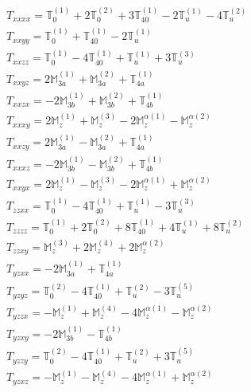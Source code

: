 \documentclass[fleqn,8pt,landscape]{jsarticle}
\begin{document}
\begin{align*}
& T_{xxxx} = \mathbb{T}_{0}^{(1)} + 2 \mathbb{T}_{0}^{(2)} + 3 \mathbb{T}_{40}^{(1)} - 2 \mathbb{T}_{u}^{(1)} - 4 \mathbb{T}_{u}^{(2)} \\
& T_{xxyy} = \mathbb{T}_{0}^{(1)} + \mathbb{T}_{40}^{(1)} - 2 \mathbb{T}_{u}^{(1)} \\
& T_{xxzz} = \mathbb{T}_{0}^{(1)} - 4 \mathbb{T}_{40}^{(1)} + \mathbb{T}_{u}^{(1)} + 3 \mathbb{T}_{u}^{(3)} \\
& T_{xxyz} = 2 \mathbb{M}_{3a}^{(1)} + \mathbb{M}_{3a}^{(2)} + \mathbb{T}_{4a}^{(1)} \\
& T_{xxzx} = - 2 \mathbb{M}_{3b}^{(1)} + \mathbb{M}_{3b}^{(2)} + \mathbb{T}_{4b}^{(1)} \\
& T_{xxxy} = 2 \mathbb{M}_{z}^{(1)} + \mathbb{M}_{z}^{(3)} - 2 \mathbb{M}_{z}^{\alpha(1)} - \mathbb{M}_{z}^{\alpha(2)} \\
& T_{xxzy} = 2 \mathbb{M}_{3a}^{(1)} - \mathbb{M}_{3a}^{(2)} + \mathbb{T}_{4a}^{(1)} \\
& T_{xxxz} = - 2 \mathbb{M}_{3b}^{(1)} - \mathbb{M}_{3b}^{(2)} + \mathbb{T}_{4b}^{(1)} \\
& T_{xxyx} = 2 \mathbb{M}_{z}^{(1)} - \mathbb{M}_{z}^{(3)} - 2 \mathbb{M}_{z}^{\alpha(1)} + \mathbb{M}_{z}^{\alpha(2)} \\
& T_{zzxx} = \mathbb{T}_{0}^{(1)} - 4 \mathbb{T}_{40}^{(1)} + \mathbb{T}_{u}^{(1)} - 3 \mathbb{T}_{u}^{(3)} \\
& T_{zzzz} = \mathbb{T}_{0}^{(1)} + 2 \mathbb{T}_{0}^{(2)} + 8 \mathbb{T}_{40}^{(1)} + 4 \mathbb{T}_{u}^{(1)} + 8 \mathbb{T}_{u}^{(2)} \\
& T_{zzxy} = \mathbb{M}_{z}^{(3)} + 2 \mathbb{M}_{z}^{(4)} + 2 \mathbb{M}_{z}^{\alpha(2)} \\
& T_{yzxx} = - 2 \mathbb{M}_{3a}^{(1)} + \mathbb{T}_{4a}^{(1)} \\
& T_{yzyz} = \mathbb{T}_{0}^{(2)} - 4 \mathbb{T}_{40}^{(1)} + \mathbb{T}_{u}^{(2)} - 3 \mathbb{T}_{u}^{(5)} \\
& T_{yzzx} = - \mathbb{M}_{z}^{(1)} + \mathbb{M}_{z}^{(4)} - 4 \mathbb{M}_{z}^{\alpha(1)} - \mathbb{M}_{z}^{\alpha(2)} \\
& T_{yzxy} = - 2 \mathbb{M}_{3b}^{(1)} - \mathbb{T}_{4b}^{(1)} \\
& T_{yzzy} = \mathbb{T}_{0}^{(2)} - 4 \mathbb{T}_{40}^{(1)} + \mathbb{T}_{u}^{(2)} + 3 \mathbb{T}_{u}^{(5)} \\
& T_{yzxz} = - \mathbb{M}_{z}^{(1)} - \mathbb{M}_{z}^{(4)} - 4 \mathbb{M}_{z}^{\alpha(1)} + \mathbb{M}_{z}^{\alpha(2)}
\end{align*}
\end{document}
